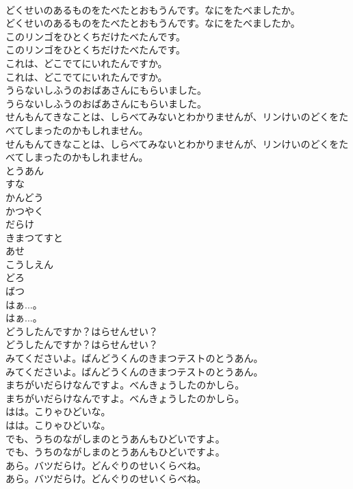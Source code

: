 \documentclass[8pt]{extreport}
\begin{document}
\begin{CJK}{UTF8}{min}
\\	どくせいのあるものをたべたとおもうんです。なにをたべましたか。	
\\	どくせいのあるものをたべたとおもうんです。なにをたべましたか。 
\\	このリンゴをひとくちだけたべたんです。	
\\	このリンゴをひとくちだけたべたんです。 
\\	これは、どこでてにいれたんですか。	
\\	これは、どこでてにいれたんですか。 
\\	うらないしふうのおばあさんにもらいました。	
\\	うらないしふうのおばあさんにもらいました。 
\\	せんもんてきなことは、しらべてみないとわかりませんが、リンけいのどくをたべてしまったのかもしれません。	
\\	せんもんてきなことは、しらべてみないとわかりませんが、リンけいのどくをたべてしまったのかもしれません。 
\\	とうあん
\\	すな
\\	かんどう
\\	かつやく
\\	だらけ
\\	きまつてすと
\\	あせ
\\	こうしえん
\\	どろ
\\	ばつ
\\	はぁ...。	
\\	はぁ...。 
\\	どうしたんですか？はらせんせい？	
\\	どうしたんですか？はらせんせい？ 
\\	みてくださいよ。ばんどうくんのきまつテストのとうあん。	
\\	みてくださいよ。ばんどうくんのきまつテストのとうあん。 
\\	まちがいだらけなんですよ。べんきょうしたのかしら。	
\\	まちがいだらけなんですよ。べんきょうしたのかしら。 
\\	はは。こりゃひどいな。	
\\	はは。こりゃひどいな。 
\\	でも、うちのながしまのとうあんもひどいですよ。	
\\	でも、うちのながしまのとうあんもひどいですよ。 
\\	あら。バツだらけ。どんぐりのせいくらべね。	
\\	あら。バツだらけ。どんぐりのせいくらべね。 

\end{CJK}
\end{document}
